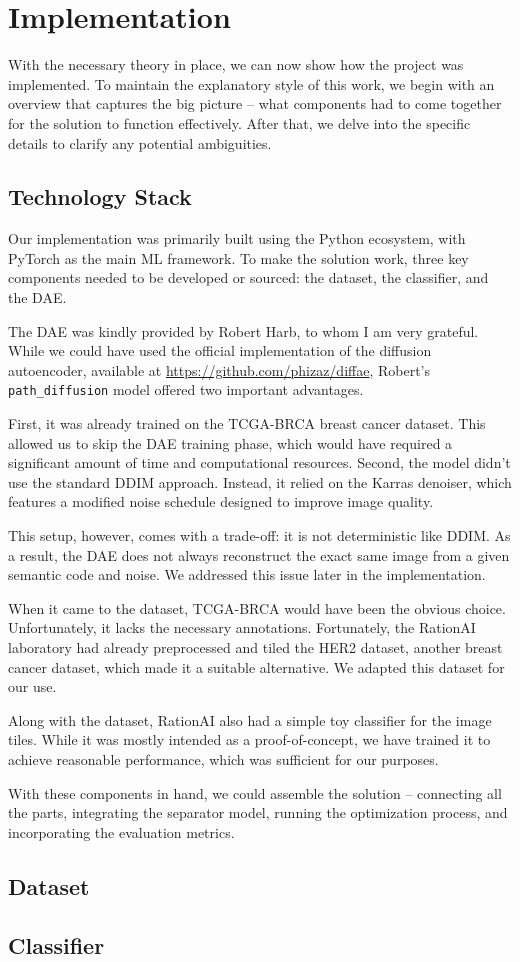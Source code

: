 \chapter{Implementation}

With the necessary theory in place, we can now show how the project was implemented. To maintain the explanatory style of this work, we begin with an overview that captures the big picture -- what components had to come together for the solution to function effectively. After that, we delve into the specific details to clarify any potential ambiguities.

\section{Technology Stack}

Our implementation was primarily built using the Python ecosystem, with PyTorch as the main ML framework. To make the solution work, three key components needed to be developed or sourced: the dataset, the classifier, and the DAE.

The DAE was kindly provided by Robert Harb, to whom I am very grateful. While we could have used the official implementation of the diffusion autoencoder, available at \url{https://github.com/phizaz/diffae}, Robert’s \texttt{path\_diffusion} model offered two important advantages.

First, it was already trained on the TCGA-BRCA breast cancer dataset. This allowed us to skip the DAE training phase, which would have required a significant amount of time and computational resources. Second, the model didn’t use the standard DDIM approach. Instead, it relied on the Karras denoiser, which features a modified noise schedule designed to improve image quality. 

This setup, however, comes with a trade-off: it is not deterministic like DDIM. As a result, the DAE does not always reconstruct the exact same image from a given semantic code and noise. We addressed this issue later in the implementation.

When it came to the dataset, TCGA-BRCA would have been the obvious choice. Unfortunately, it lacks the necessary annotations. Fortunately, the RationAI laboratory had already preprocessed and tiled the HER2 dataset, another breast cancer dataset, which made it a suitable alternative. We adapted this dataset for our use.

Along with the dataset, RationAI also had a simple toy classifier for the image tiles. While it was mostly intended as a proof-of-concept, we have trained it to achieve reasonable performance, which was sufficient for our purposes.

With these components in hand, we could assemble the solution -- connecting all the parts, integrating the separator model, running the optimization process, and incorporating the evaluation metrics.

\section{Dataset}

\section{Classifier}

